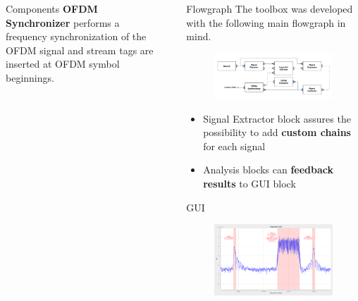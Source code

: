 \documentclass{beamer}
\begin{document}
\begin{frame}
\begin{columns}[t]
\begin{column}{0.33\textwidth}
\begin{block}{Components}
\textbf{OFDM Synchronizer}
performs a frequency synchronization of the OFDM signal and stream tags are inserted at OFDM symbol beginnings.
\vspace{1.5em}
      \end{block}
    \end{column}
    \begin{column}{0.01\textwidth}
    \end{column}
    \begin{column}{0.66\textwidth}
      \begin{block}{Flowgraph}
        The toolbox was developed with the following main flowgraph in mind.
        \begin{figure}
          \includegraphics[width=\textwidth]{figures/flowgraph}
        \end{figure}
        \begin{itemize}
          \item Signal Extractor block assures the possibility to add \textbf{custom chains} for each signal 
          \item Analysis blocks can \textbf{feedback results} to GUI block
        \end{itemize}
      \end{block}
      \begin{block}{GUI}
      \begin{figure}
      	\includegraphics[width=\textwidth]{figures/gui.png}

\end{figure}
\end{block}
\end{column}
\end{columns}
\end{frame}
\end{document}
